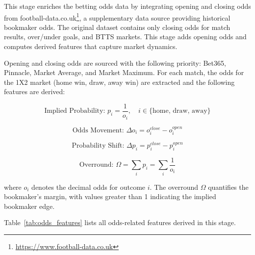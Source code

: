\documentclass[pdflatex,sn-mathphys-num]{sn-jnl}
\theoremstyle{thmstyleone}
\theoremstyle{thmstyletwo}
\theoremstyle{thmstylethree}
\begin{document}
This stage enriches the betting odds data by integrating opening and closing odds from football-data.co.uk\footnote{\url{https://www.football-data.co.uk}}, a supplementary data source providing historical bookmaker odds. The original dataset contains only closing odds for match results, over/under goals, and BTTS markets. This stage adds opening odds and computes derived features that capture market dynamics.

Opening and closing odds are sourced with the following priority: Bet365, Pinnacle, Market Average, and Market Maximum. For each match, the odds for the 1X2 market (home win, draw, away win) are extracted and the following features are derived:

\begin{equation}
\text{Implied Probability: } p_{i} = \frac{1}{o_{i}}, \quad i \in \{\text{home, draw, away}\}
\label{eq:implied}
\end{equation}

\begin{equation}
\text{Odds Movement: } \Delta o_{i} = o^{close}_{i} - o^{open}_{i}
\label{eq:odds_move}
\end{equation}

\begin{equation}
\text{Probability Shift: } \Delta p_{i} = p^{close}_{i} - p^{open}_{i}
\label{eq:prob_shift}
\end{equation}

\begin{equation}
\text{Overround: } \Omega = \sum_{i} p_{i} = \sum_{i} \frac{1}{o_{i}}
\label{eq:overround}
\end{equation}

where $o_{i}$ denotes the decimal odds for outcome $i$. The overround $\Omega$ quantifies the bookmaker's margin, with values greater than 1 indicating the implied bookmaker edge.

Table~\ref{tab:odds_features} lists all odds-related features derived in this stage.
\end{document}
